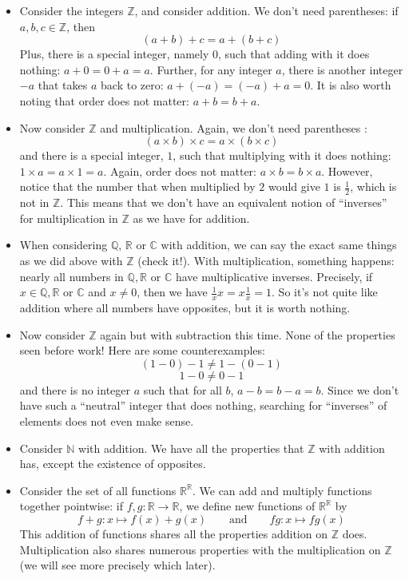 \documentclass{book}
\newcommand{\N}{\mathbb{N}}
\newcommand{\Z}{\mathbb{Z}}
\newcommand{\Q}{\mathbb{Q}}
\newcommand{\R}{\mathbb{R}}
\newcommand{\C}{\mathbb{C}}
\theoremstyle{plain}
\theoremstyle{definition}
\theoremstyle{remark}
\begin{document}
\begin{itemize}
    \item Consider the integers $\Z$, and consider addition. We don't need parentheses: if $a,b,c \in \Z$, then
    \[(a+b)+c = a + (b+c)\]
    Plus, there is a special integer, namely $0$, such that adding with it does nothing: $a+0=0+a=a$. Further, for any integer $a$, there is another integer $-a$ that takes $a$ back to zero: $a+(-a) = (-a)+a = 0$. It is also worth noting that order does not matter: $a+b = b+a$.
    \item Now consider $\Z$ and multiplication. Again, we don't need parentheses :
    \[(a\times b) \times c = a\times (b\times c)\]
    and there is a special integer, $1$, such that multiplying with it does nothing: $1\times a = a \times 1 = a$. Again, order does not matter: $a\times b = b\times a$. However, notice that the number that when multiplied by $2$ would give $1$ is $\frac{1}{2}$, which is not in $\Z$. This means that we don't have an equivalent notion of ``inverses'' for multiplication in $\Z$ as we have for addition.
    \item When considering $\Q$, $\R$ or $\C$ with addition, we can say the exact same things as we did above with $\Z$ (check it!). With multiplication, something happens: nearly all numbers in $\Q,\R$ or $\C$ have multiplicative inverses. Precisely, if $x \in \Q,\R$ or $\C$ and $x \ne 0$, then we have $\frac{1}{x} x = x\frac{1}{x} = 1$. So it's not quite like addition where all numbers have opposites, but it is worth nothing.
    \item Now consider $\Z$ again but with subtraction this time. None of the properties seen before work! Here are some counterexamples:
    \[(1-0)-1 \ne 1-(0-1) \]
    \[1-0 \ne 0-1\]
    and there is no integer $a$ such that for all $b$, $a-b = b-a = b$. Since we don't have such a ``neutral'' integer that does nothing, searching for ``inverses'' of elements does not even make sense.
    \item Consider $\N$ with addition. We have all the properties that $\Z$ with addition has, except the existence of opposites.
    \item Consider the set of all functions $\R^\R$. We can add and multiply functions together pointwise: if $f,g : \R \to \R$, we define new functions of $\R^\R$ by
    \[f+g : x\mapsto f(x) + g(x) \qquad \text{and} \qquad fg : x \mapsto fg(x)\]
    This addition of functions shares all the properties addition on $\Z$ does. Multiplication also shares numerous properties with the multiplication on $\Z$ (we will see more precisely which later).

\end{itemize}
\end{document}
